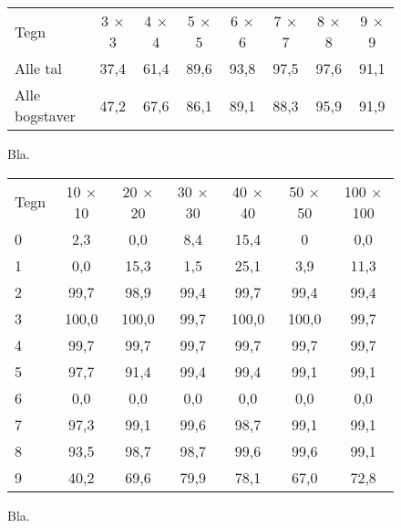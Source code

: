 \begin{figure}[htp]
\centering
\begin{tabular}{|l|c|c|c|c|c|c|c|}\hline
\rowcolor[gray]{0.9} \multicolumn{8}{|>{\columncolor[gray]{0.9}}c|}{\textbf{Sum-billeder}} \\ \hline
Tegn & 3 $\times$ 3 & 4 $\times$ 4 & 5 $\times$ 5 & 6 $\times$ 6 & 7 $\times$ 7 & 8 $\times$ 8 & 9 $\times$ 9 \\\hline
Alle tal & 37,4 & 61,4 & 89,6 & 93,8 & 97,5 & 97,6 & 91,1\\\hline
Alle bogstaver & 47,2 & 67,6 & 86,1 & 89,1 & 88,3 & 95,9 & 91,9\\\hline
\end{tabular}
\caption{Bla.}
\label{fig:test:sum_alletegn}
\end{figure}

\begin{figure}[htp]
\centering
\begin{tabular}{|l|c|c|c|c|c|c|}\hline
\rowcolor[gray]{0.9} \multicolumn{7}{|>{\columncolor[gray]{0.9}}c|}{\textbf{Forenings-billeder}} \\ \hline
Tegn & 10 $\times$ 10 & 20 $\times$ 20 & 30 $\times$ 30 & 40 $\times$ 40 & 50 $\times$ 50 & 100 $\times$ 100\\\hline
0 & 2,3 & 0,0 & 8,4 & 15,4 & 0 & 0,0\\\hline
1 & 0,0 & 15,3 & 1,5 & 25,1 & 3,9 & 11,3\\\hline
2 & 99,7 & 98,9 & 99,4 & 99,7 & 99,4 & 99,4\\\hline
3 & 100,0 & 100,0 & 99,7 & 100,0 & 100,0 & 99,7\\\hline
4 & 99,7 & 99,7 & 99,7 & 99,7 & 99,7 & 99,7\\\hline
5 & 97,7 & 91,4 & 99,4 & 99,4 & 99,1 & 99,1\\\hline
6 & 0,0 & 0,0 & 0,0 & 0,0 & 0,0 & 0,0\\\hline
7 & 97,3 & 99,1 & 99,6 & 98,7 & 99,1 & 99,1\\\hline
8 & 93,5 & 98,7 & 98,7 & 99,6 & 99,6 & 99,1\\\hline
9 & 40,2 & 69,6 & 79,9 & 78,1 & 67,0 & 72,8\\\hline
\end{tabular}
\caption{Bla.}
\label{fig:test:and_tal}
\end{figure}

